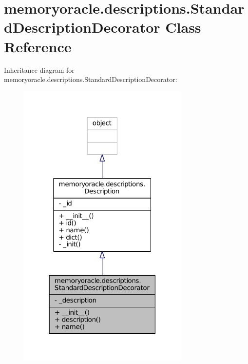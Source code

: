 \hypertarget{classmemoryoracle_1_1descriptions_1_1StandardDescriptionDecorator}{}\section{memoryoracle.\+descriptions.\+Standard\+Description\+Decorator Class Reference}
\label{classmemoryoracle_1_1descriptions_1_1StandardDescriptionDecorator}


Inheritance diagram for memoryoracle.\+descriptions.\+Standard\+Description\+Decorator\+:\nopagebreak
\begin{figure}[H]
\begin{center}
\leavevmode
\includegraphics[width=243pt]{classmemoryoracle_1_1descriptions_1_1StandardDescriptionDecorator__inherit__graph}
\end{center}
\end{figure}


